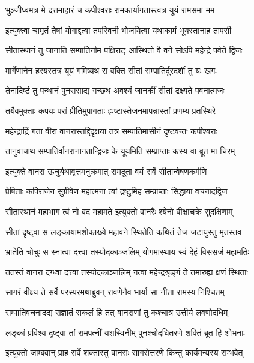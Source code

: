 \twolineshloka
{भुञ्जीध्वमत्र मे दत्तमाहारं च कपीश्वराः}
{रामकार्यागतास्त्वत्र यूयं रामसमा मम} %

\twolineshloka
{इत्युक्त्वा चामृतं तेषां योगाद्दत्वा तपस्विनी}
{भोजयित्वा यथाकामं भूयस्तानाह तापसी} %

\twolineshloka
{सीतास्थानं तु जानाति सम्पातिर्नाम पक्षिराट्}
{आस्थितो वै वने सोऽपि महेन्द्रे पर्वते द्विजः} %

\twolineshloka
{मार्गेणानेन हरयस्तत्र यूयं गमिष्यथ}
{स वक्ति सीतां सम्पातिर्दूरदर्शी तु यः खगः} %

\twolineshloka
{तेनादिष्टं तु पन्थानं पुनरासाद्य गच्छथ}
{अवश्यं जानकीं सीतां द्रक्ष्यते पवनात्मजः} %

\twolineshloka
{तयैवमुक्ताः कपयः परां प्रीतिमुपागताः}
{ह्यष्टास्तेजनमापन्नास्तां प्रणम्य प्रतस्थिरे} %

\twolineshloka
{महेन्द्राद्रिं गता वीरा वानरास्तद्दिदृक्षया}
{तत्र सम्पातिमासीनं दृष्टवन्तः कपीश्वराः} %

\twolineshloka
{तानुवाचाथ सम्पातिर्वानरानागतान्द्विजः}
{के यूयमिति सम्प्राप्ताः कस्य वा ब्रूत मा चिरम्} %

\twolineshloka
{इत्युक्ते वानरा ऊचुर्यथावृत्तमनुक्रमात्}
{रामदूता वयं सर्वे सीतान्वेषणकर्मणि} %

\twolineshloka
{प्रेषिताः कपिराजेन सुग्रीवेण महात्मना}
{त्वां द्रष्टुमिह सम्प्राप्ताः सिद्धाया वचनादद्विज} %

\twolineshloka
{सीतास्थानं महाभाग त्वं नो वद महामते}
{इत्युक्तो वानरैः श्येनो वीक्षाचक्रे सुदक्षिणाम्} %

\twolineshloka
{सीतां दृष्ट्वा स लङ्कायामशोकाख्ये महावने}
{स्थितेति कथितं तेज जटायुस्तु मृतस्तव} %

\twolineshloka
{भ्रातेति चोचुः स स्नात्वा दत्त्वा तस्योदकाञ्जलिम्}
{योगमास्थाय स्वं देहं विससर्ज महामतिः} %

\twolineshloka
{ततस्तं वानरा दग्ध्वा दत्त्वा तस्योदकाञ्जलिम्}
{गत्वा महेन्द्रश्रृङ्गं ते तमारुह्य क्षणं स्थिताः} %

\twolineshloka
{सागरं वीक्ष्य ते सर्वे परस्परमथाब्रुवन्}
{रावणेनैव भार्या सा नीता रामस्य निश्चितम्} %

\twolineshloka
{सम्पातिवचनादद्य सज्ञातं सकलं हि तत्}
{वानराणां तु कश्चात्र उत्तीर्य लवणोदधिम्} %

\twolineshloka
{लङ्कां प्रविश्य दृष्ट्वा तां रामपत्नीं यशस्विनीम्}
{पुनश्चोदधितरणे शक्तिं ब्रूत हि शोभनाः} %

\twolineshloka
{इत्युक्तो जाम्बवान् प्राह सर्वे शक्तास्तु वानराः}
{सागरोत्तरणे किन्तु कार्यमन्यस्य सम्भवेत्} %

